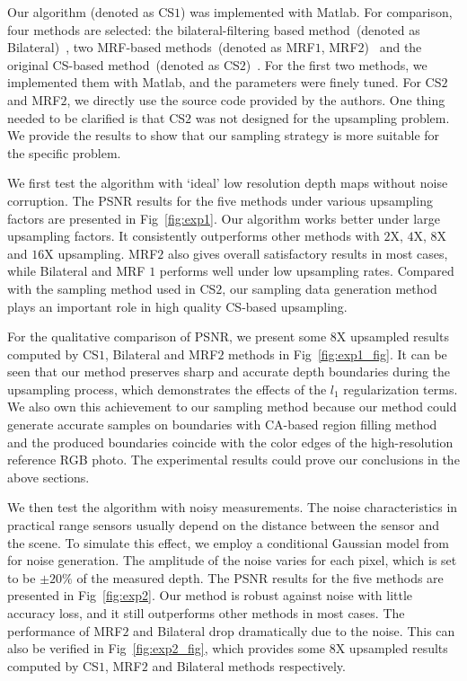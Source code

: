 \documentclass[preprint,10pt,5p,times,twocolumn]{elsarticle}
\begin{document}
Our algorithm (denoted as CS$1$) was implemented with Matlab. For comparison, four methods are selected: the bilateral-filtering based method~(denoted as Bilateral)~\cite{YYDN07}, two MRF-based methods~(denoted as MRF$1$, MRF$2$)~\cite{DT05,PKTBK11} and the original CS-based method~(denoted as CS$2$)~\cite{HKD11}. For the first two methods, we implemented them with Matlab, and the parameters were finely tuned.  For CS$2$ and MRF$2$, we directly use the source code provided by the authors. One thing needed to be clarified is that CS$2$ was not designed for the upsampling problem. We provide the results to show that our sampling strategy is more suitable for the specific problem.


We first test the algorithm with `ideal' low resolution depth maps without noise corruption. The PSNR results for the five methods under various upsampling factors are presented in Fig~\ref{fig:exp1}. Our algorithm works better under large upsampling factors. It consistently outperforms other methods with $2$X, $4$X, $8$X and $16$X upsampling. MRF$2$ also gives overall satisfactory results in most cases, while Bilateral and MRF $1$ performs well under low upsampling rates. Compared with the sampling method used in CS$2$, our sampling data generation method plays an important role in high quality CS-based upsampling.



For the qualitative comparison of PSNR, we present some $8$X upsampled results computed by CS$1$, Bilateral and MRF$2$ methods in Fig~\ref{fig:exp1_fig}. It can be seen that our method preserves sharp and accurate depth boundaries during the upsampling process, which demonstrates the effects of the $l_{1}$ regularization terms. We also own this achievement to our sampling method because our method could generate accurate samples on boundaries with CA-based region filling method and the produced boundaries coincide with the color edges of  the high-resolution reference RGB photo. The experimental results could prove our conclusions in the above sections.


We then test the algorithm with noisy measurements. The noise characteristics in practical range sensors usually depend on the distance between the sensor and the scene. To simulate this effect, we employ a conditional Gaussian model from~\cite{PKTBK11} for noise generation. The amplitude of the noise varies for each pixel, which is set to be $\pm20\%$ of the measured depth. The PSNR results for the five methods are presented in Fig~\ref{fig:exp2}. Our method is robust against noise with little accuracy loss, and it still outperforms other methods in most cases. The performance of MRF$2$ and Bilateral drop dramatically due to the noise. This can also be verified in Fig~\ref{fig:exp2_fig}, which provides some $8$X upsampled results computed by CS$1$, MRF$2$ and Bilateral methods respectively.
\end{document}
